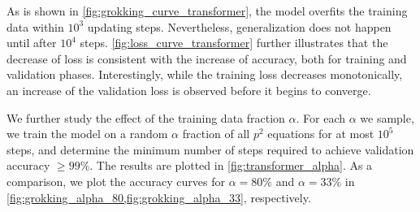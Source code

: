 As is shown in \cref{fig:grokking_curve_transformer}, the model overfits the training data within $10^3$ updating steps.
Nevertheless, generalization does not happen until after $10^4$ steps.
\cref{fig:loss_curve_transformer} further illustrates that the decrease of loss is consistent with the increase of accuracy, both for training and validation phases.
Interestingly, while the training loss decreases monotonically, an increase of the validation loss is observed before it begins to converge.

We further study the effect of the training data fraction $\alpha$. 
For each $\alpha$ we sample, we train the model on a random $\alpha$ fraction of all $p^2$ equations for at most $10^5$ steps, and determine the minimum number of steps required to achieve validation accuracy $\geq 99\%$.
The results are plotted in \cref{fig:transformer_alpha}.
As a comparison, we plot the accuracy curves for $\alpha = 80\%$ and $\alpha = 33\%$ in \cref{fig:grokking_alpha_80,fig:grokking_alpha_33}, respectively.

